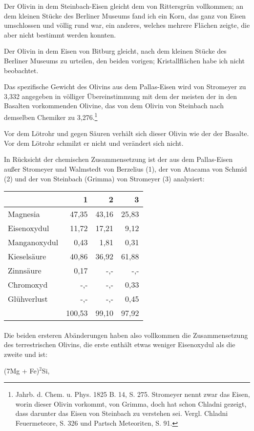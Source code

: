 \documentclass[a4paper, 11pt, oneside]{article}
\begin{document}
Der Olivin in dem Steinbach-Eisen gleicht dem von Rittersgrün vollkommen; an dem kleinen Stücke des Berliner Museums fand ich ein Korn, das ganz von Eisen umschlossen und völlig rund war, ein anderes, welches mehrere Flächen zeigte, die aber nicht bestimmt werden konnten.

Der Olivin in dem Eisen von Bitburg gleicht, nach dem kleinen Stücke des Berliner Museums zu urteilen, den beiden vorigen; Kristallflächen habe ich nicht beobachtet.

Das spezifische Gewicht des Olivins aus dem Pallas-Eisen wird von Stromeyer zu 3,332 angegeben in völliger Übereinstimmung mit dem der meisten der in den Basalten vorkommenden Olivine, das von dem Olivin von Steinbach nach demselben Chemiker zu 3,276.\footnote{Jahrb. d. Chem. u. Phys. 1825 B. 14, S. 275. Stromeyer nennt zwar das Eisen, worin dieser Olivin vorkommt, von Grimma, doch hat schon Chladni gezeigt, dass darunter das Eisen von Steinbach zu verstehen sei. Vergl. Chladni Feuermeteore, S. 326 und Partsch Meteoriten, S. 91.}

Vor dem Lötrohr und gegen Säuren verhält sich dieser Olivin wie der der Basalte. Vor dem Lötrohr schmilzt er nicht und verändert sich nicht.

In Rücksicht der chemischen Zusammensetzung ist der aus dem Pallas-Eisen außer Stromeyer und Walmstedt von Berzelius (1), der von Atacama von Schmid (2) und der von Steinbach (Grimma) von Stromeyer (3) analysiert:
\begin{center}
\begin{tabular}{ |l|r|r|r| }
    \hline
     & 1 & 2 & 3\\
    \hline\hline
    Magnesia & 47,35 & 43,16 & 25,83\\\hline
    Eisenoxydul & 11,72 & 17,21 & 9,12\\\hline
    Manganoxydul & 0,43 & 1,81 & 0,31\\\hline
    Kieselsäure & 40,86 & 36,92 & 61,88\\\hline
    Zinnsäure & 0,17 & -,- & -,-\\\hline
    Chromoxyd & -,- & -,- & 0,33\\\hline
    Glühverlust & -,- & -,- & 0,45\\\hline
     &100,53 & 99,10 & 97,92\\
    \hline
\end{tabular}
\end{center}
\paragraph{}
Die beiden ersteren Abänderungen haben also vollkommen die Zusammensetzung des terrestrischen Olivins, die erste enthält etwas weniger Eisenoxydul als die zweite und ist:
\begin{center}
(7Mg + Fe)$^{2}$Si,
\end{center}
\end{document}
